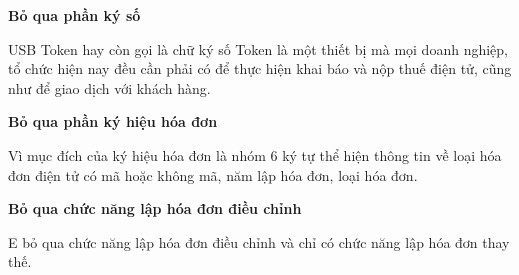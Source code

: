 \textbf{Bỏ qua phần ký số}



















USB Token hay còn gọi là chữ ký số Token là một thiết bị mà mọi doanh nghiệp, tổ chức hiện nay đều cần phải có để thực hiện khai báo và nộp thuế điện tử, cũng như để giao dịch với khách hàng.



















\textbf{Bỏ qua phần ký hiệu hóa đơn}



















Vì mục đích của ký hiệu hóa đơn là nhóm 6 ký tự thể hiện thông tin về loại hóa đơn điện tử có mã hoặc không mã, năm lập hóa đơn, loại hóa đơn.



















\textbf{Bỏ qua chức năng lập hóa đơn điều chỉnh}



















E bỏ qua chức năng lập hóa đơn điều chỉnh và chỉ có chức năng lập hóa đơn thay thế.



















